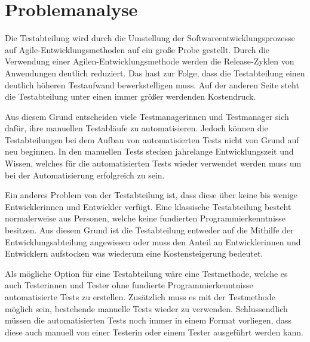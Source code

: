\chapter{Problemanalyse}
\label{cha:Problemanalyse}

Die Testabteilung wird durch die Umstellung der Softwareentwicklungsprozesse auf Agile-Entwicklungsmethoden auf ein große Probe gestellt. Durch die Verwendung einer Agilen-Entwicklungsmethode werden die Release-Zyklen von Anwendungen deutlich reduziert. Das hast zur Folge, dass die Testabteilung einen deutlich höheren Testaufwand bewerkstelligen muss. Auf der anderen Seite steht die Testabteilung unter einen immer größer werdenden Kostendruck. 

\SuperPar
Aus diesem Grund entscheiden viele Testmanagerinnen und Testmanager sich dafür, ihre manuellen Testabläufe zu automatisieren. Jedoch können die Testabteilungen bei dem Aufbau von automatisierten Tests nicht von Grund auf neu beginnen. In den manuellen Tests stecken jahrelange Entwicklungszeit und Wissen, welches für die automatisierten Tests wieder verwendet werden muss um bei der Automatisierung erfolgreich zu sein. 

\SuperPar
Ein anderes Problem von der Testabteilung ist, dass diese über keine bis wenige Entwicklerinnen und Entwickler verfügt. Eine klassische Testabteilung besteht normalerweise aus Personen, welche keine fundierten Programmierkenntnisse besitzen. Aus diesem Grund ist die Testabteilung entweder auf die Mithilfe der Entwicklungsabteilung angewiesen oder muss den Anteil an Entwicklerinnen und Entwicklern aufstocken was wiederum eine Kostensteigerung bedeutet.

\SuperPar
Als mögliche Option für eine Testabteilung wäre eine Testmethode, welche es auch Testerinnen und Tester ohne fundierte Programmierkenntnisse automatisierte Tests zu erstellen. Zusätzlich muss es mit der Testmethode möglich sein, bestehende manuelle Tests wieder zu verwenden. Schlussendlich müssen die automatisierten Tests noch immer in einem Format vorliegen, dass diese auch manuell von einer Testerin oder einem Tester ausgeführt werden kann.